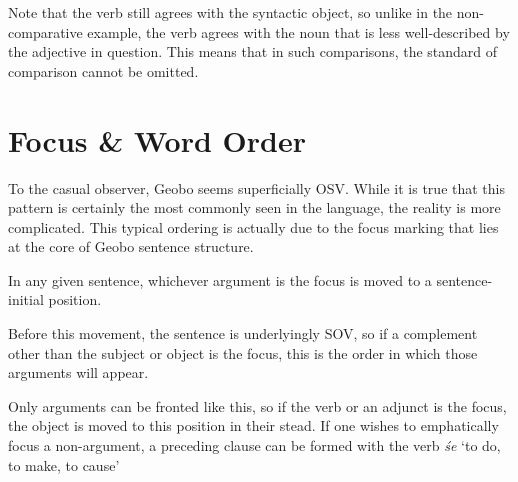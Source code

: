 \documentclass[a4paper,11pt,oneside,openany]{memoir}
\begin{document}

Note that the verb still agrees with the syntactic object, so unlike in the non-comparative example, the verb agrees with the noun that is less well-described by the adjective in question. This means that in such comparisons, the standard of comparison cannot be omitted.

\section{Focus \& Word Order}\label{focus}

To the casual observer, Geobo{\engma} seems superficially OSV. While it is true that this pattern is certainly the most commonly seen in the language, the reality is more complicated. This typical ordering is actually due to the focus marking that lies at the core of Geobo{\engma} sentence structure.

In any given sentence, whichever argument is the focus is moved to a sentence-initial position. 



Before this movement, the sentence is underlyingly SOV, so if a complement other than the subject or object is the focus, this is the order in which those arguments will appear.


Only arguments can be fronted like this, so if the verb or an adjunct is the focus, the object is moved to this position in their stead. If one wishes to emphatically focus a non-argument, a preceding clause can be formed with the verb \textit{\'se} `to do, to make, to cause'

\end{document}

